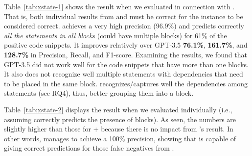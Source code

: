 Table~\ref{tab:xstate-1} shows the result when we evaluated {\xstate}
in connection with {\xblock}. That is, both individual results from
{\xblock} and {\xstate} must be correct for the instance to be
considered correct. {\tool} achieves a very high precision (96.9\%)
and predicts correctly {\em all the statements in all 
  blocks} (could have multiple blocks) for 61\% of the positive code
snippets. It improves relatively over GPT-3.5 {\bf
  76.1\%}, {\bf 161.7\%}, and {\bf 128.7\%} in Precision, Recall, and
F1-score. Examining the results, we found that GPT-3.5 did not work
well for the code snippets that have more than one 
blocks. It also does not recognize well multiple statements with
dependencies that need to be placed in the same block. {\tool}
recognizes/captures well the dependencies among statements (see RQ4),
thus, better grouping them into a  block.


Table~\ref{tab:xstate-2} displays the result when we evaluated
{\xstate} individually (i.e., assuming {\xblock} correctly predicts
the presence of  blocks). As seen, the numbers are
slightly higher than those for {\xblock}+{\xstate} because there is no
impact from {\xblock}'s result. In other words, {\xstate} manages to
achieve a 100\% precision, showing that {\xstate} is capable of giving
correct predictions for those false negatives from {\xblock}.


%

